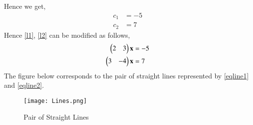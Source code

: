 \documentclass[journal,12pt,twocolumn]{IEEEtran}
\begin{document}
Hence we get,
\begin{align}
    c_1&=-5\\
    c_2&=7
\end{align}
Hence \eqref{l1}, \eqref{l2} can be modified as follows,
\begin{align}
    \begin{pmatrix}2 & 3\end{pmatrix}\mathbf{x}&=-5\label{eqline1}\\
    \begin{pmatrix}3 & -4\end{pmatrix}\mathbf{x}&=7\label{eqline2}
\end{align}
The figure below corresponds to the pair of straight lines represented by \eqref{eqline1} and \eqref{eqline2}.
\renewcommand{\thefigure}{1}
\begin{figure}[h!]
\centering
\texttt{[image: Lines.png]}
\caption{Pair of Straight Lines}
\label{fig:my_label}
\end{figure}
\end{document}
